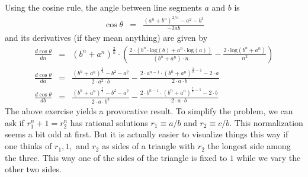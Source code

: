 \documentclass[aps,preprint,preprintnumbers,nofootinbib,showpacs,prd]{revtex4-1}
\newcommand{\nbea}{\begin{eqnarray*}}
\newcommand{\neea}{\end{eqnarray*}}
\begin{document}
Using the cosine rule, the angle between line segments $a$ and $b$ is
%
\nbea
\cos \theta & = & \frac{(a^n + b^n)^{2/n} - a^2 - b^2}{-2 a b}
\neea
%
and its derivatives (if they mean anything) are given by
%
\nbea
\frac{d\cos \theta}{dn} & = & {{\left( {{b}^{n}}+{{a}^{n}}\right) }^{\frac{2}{n}}}\cdot \left( \frac{2\cdot \left( {{b}^{n}}\cdot \mathrm{log}\left( b\right) +{{a}^{n}}\cdot \mathrm{log}\left( a\right) \right) }{\left( {{b}^{n}}+{{a}^{n}}\right) \cdot n}-\frac{2\cdot \mathrm{log}\left( {{b}^{n}}+{{a}^{n}}\right) }{{{n}^{2}}}\right) \\
\frac{d\cos \theta}{da} & = & \frac{{{\left( {{b}^{n}}+{{a}^{n}}\right) }^{\frac{2}{n}}}-{{b}^{2}}-{{a}^{2}}}{2\cdot {{a}^{2}}\cdot b}-\frac{2\cdot {{a}^{n-1}}\cdot {{\left( {{b}^{n}}+{{a}^{n}}\right) }^{\frac{2}{n}-1}}-2\cdot a}{2\cdot a\cdot b} \\
\frac{d\cos \theta}{db} & = & \frac{{{\left( {{b}^{n}}+{{a}^{n}}\right) }^{\frac{2}{n}}}-{{b}^{2}}-{{a}^{2}}}{2\cdot a\cdot {{b}^{2}}}-\frac{2\cdot {{b}^{n-1}}\cdot {{\left( {{b}^{n}}+{{a}^{n}}\right) }^{\frac{2}{n}-1}}-2\cdot b}{2\cdot a\cdot b}
\neea
%
The above exercise yields a provocative result. To simplify the problem, we can ask if $r_1^n + 1 = r_2^n$ has rational solutions $r_1 \equiv a/b$ and $r_2 \equiv c/b$. This normalization seems a bit odd at first. But it is actually easier to visualize things this way if one thinks of $r_1, 1,$ and $r_2$ as sides of a triangle with $r_2$ the longest side among the three. This way one of the sides of the triangle is fixed to $1$ while we vary the other two sides.
%
\end{document}
